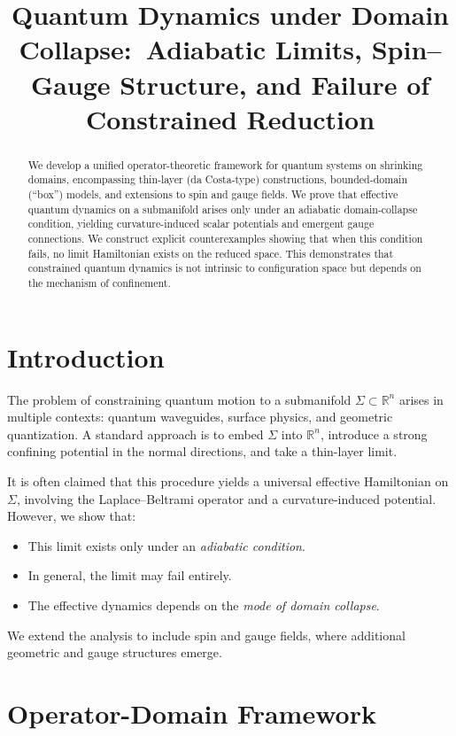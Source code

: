 \documentclass[11pt]{article}
\title{\textbf{Quantum Dynamics under Domain Collapse:\
Adiabatic Limits, Spin--Gauge Structure, and Failure of Constrained Reduction}}
\author{}
\date{}
\begin{document}
\maketitle

\begin{abstract}
We develop a unified operator-theoretic framework for quantum systems on shrinking domains, encompassing thin-layer (da Costa-type) constructions, bounded-domain (“box”) models, and extensions to spin and gauge fields. We prove that effective quantum dynamics on a submanifold arises only under an adiabatic domain-collapse condition, yielding curvature-induced scalar potentials and emergent gauge connections. We construct explicit counterexamples showing that when this condition fails, no limit Hamiltonian exists on the reduced space. This demonstrates that constrained quantum dynamics is not intrinsic to configuration space but depends on the mechanism of confinement.
\end{abstract}

\section{Introduction}

The problem of constraining quantum motion to a submanifold $\Sigma \subset \mathbb{R}^n$ arises in multiple contexts: quantum waveguides, surface physics, and geometric quantization. A standard approach is to embed $\Sigma$ into $\mathbb{R}^n$, introduce a strong confining potential in the normal directions, and take a thin-layer limit.

It is often claimed that this procedure yields a universal effective Hamiltonian on $\Sigma$, involving the Laplace--Beltrami operator and a curvature-induced potential. However, we show that:

\begin{itemize}
\item This limit exists only under an \emph{adiabatic condition}.
\item In general, the limit may fail entirely.
\item The effective dynamics depends on the \emph{mode of domain collapse}.
\end{itemize}

We extend the analysis to include spin and gauge fields, where additional geometric and gauge structures emerge.

\section{Operator-Domain Framework}
\end{document}
